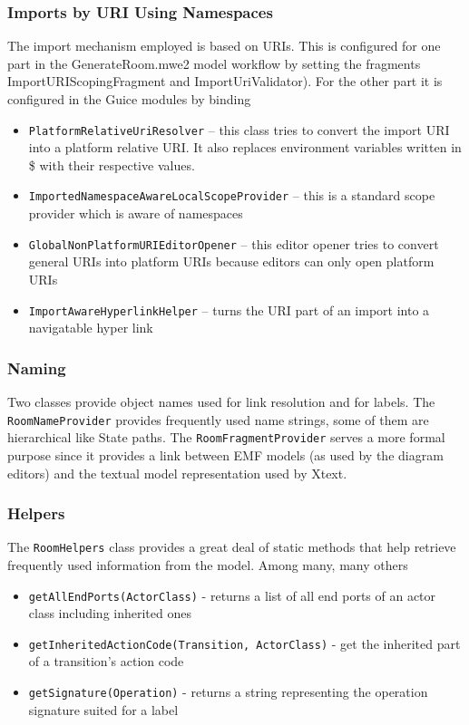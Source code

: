 \subsubsection{Imports by URI Using Namespaces}

The import mechanism employed is based on URIs. This is configured for one part in the GenerateRoom.mwe2 
model workflow by setting the fragments ImportURIScopingFragment and ImportUriValidator). For the other 
part it is configured in the Guice modules by binding
\begin{itemize}
\item \texttt{PlatformRelativeUriResolver} -- this class tries to convert the import URI into a platform 
relative URI. It also replaces environment variables written in \${} with their respective values.
\item \texttt{ImportedNamespaceAwareLocalScopeProvider} -- this is a standard scope provider which is 
aware of namespaces
\item \texttt{GlobalNonPlatformURIEditorOpener} -- this editor opener tries to convert general URIs into 
platform URIs because editors can only open platform URIs
\item \texttt{ImportAwareHyperlinkHelper} -- turns the URI part of an import into a navigatable hyper link
\end{itemize}

\subsubsection{Naming}

Two classes provide object names used for link resolution and for labels.
The \texttt{RoomNameProvider} provides frequently used name strings, some of them are hierarchical like 
State paths.
The \texttt{RoomFragmentProvider} serves a more formal purpose since it provides a link between EMF models 
(as used by the diagram editors) and the textual model representation used by Xtext.

\subsubsection{Helpers}

The \texttt{RoomHelpers} class provides a great deal of static methods that help retrieve frequently used 
information from the model.
Among many, many others
\begin{itemize}
\item \texttt{getAllEndPorts(ActorClass)} - returns a list of all end ports of an actor class including 
inherited ones
\item \texttt{getInheritedActionCode(Transition, ActorClass)} - get the inherited part of a transition's 
action code
\item \texttt{getSignature(Operation)} - returns a string representing the operation signature suited for 
a label
\end{itemize}

